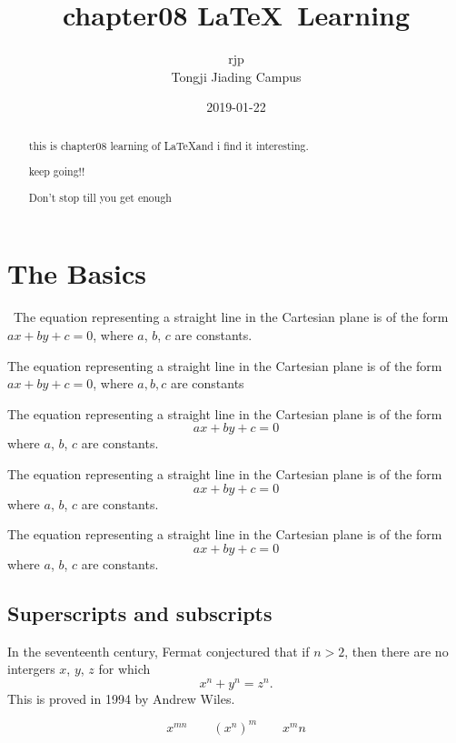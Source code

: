 \documentclass[a4paper, UTF8]{article}
\begin{document}
\title{\Huge chapter08 \LaTeX\ Learning}
\author{\Large rjp \\
            Tongji Jiading Campus}
\date{2019-01-22}
\maketitle

\begin{abstract}
\large
    this is chapter08 learning of \LaTeX and i find it interesting.
    
    keep going!!

    Don't stop till you get enough
\end{abstract}
\thispagestyle{empty}
\newpage

\tableofcontents
{}

\newpage
{}
\section{\Large The Basics}
\quad\ The equation representing a straight line in the Cartesian plane is of the form $ax+by+c=0$, where $a$, $b$, $c$ are constants.

The equation representing a straight line in the Cartesian plane is of the form $ax+by+c=0$, where $a, b, c$ are constants

The equation representing a straight line in the Cartesian plane is of the form 
$$
ax+by+c=0
$$
where $a$, $b$, $c$ are constants.

The equation representing a straight line in the Cartesian plane is of the form 
\[
ax+by+c=0
\]
where $a$, $b$, $c$ are constants.

The equation representing a straight line in the Cartesian plane is of the form 
\begin{displaymath}
ax+by+c=0
\end{displaymath}
where $a$, $b$, $c$ are constants.

\subsection{\large Superscripts and subscripts}
In the seventeenth century, Fermat conjectured that if $n>2$, then there are no intergers $x$, $y$, $z$ for which
$$
x^n+y^n=z^n.
$$
This is proved in 1994 by Andrew Wiles.

$$
x^{mn} \qquad (x^n)^m \qquad x^mn
$$
\end{document}
